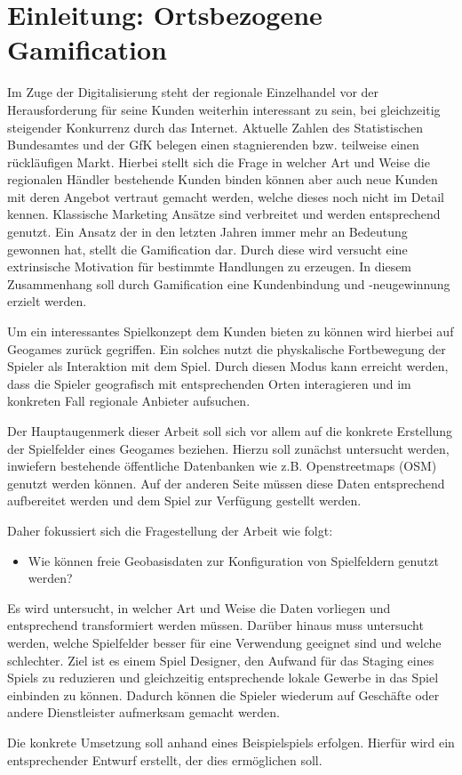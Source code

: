 \chapter{Einleitung: Ortsbezogene Gamification}
\label{ch1:Einleitung}

Im Zuge der Digitalisierung steht der regionale Einzelhandel vor der Herausforderung für seine Kunden weiterhin interessant zu sein, bei gleichzeitig steigender Konkurrenz durch das Internet. Aktuelle Zahlen des Statistischen Bundesamtes \citep{DWN.2012} und der GfK belegen einen stagnierenden bzw. teilweise einen rückläufigen Markt.
Hierbei stellt sich die Frage in welcher Art und Weise die regionalen Händler bestehende Kunden binden können aber auch neue Kunden mit deren Angebot vertraut gemacht werden, welche dieses noch nicht im Detail kennen.
Klassische Marketing Ansätze sind verbreitet und werden entsprechend genutzt.
Ein Ansatz der in den letzten Jahren immer mehr an Bedeutung gewonnen hat, stellt die Gamification dar. Durch diese wird versucht eine extrinsische Motivation für bestimmte Handlungen zu erzeugen. In diesem Zusammenhang soll durch Gamification eine Kundenbindung und -neugewinnung erzielt werden.

Um ein interessantes Spielkonzept dem Kunden bieten zu können wird hierbei auf Geogames zurück gegriffen.
Ein solches nutzt die physkalische Fortbewegung der Spieler als Interaktion mit dem Spiel.
Durch diesen Modus kann erreicht werden, dass die Spieler geografisch mit entsprechenden Orten interagieren und im konkreten Fall regionale Anbieter aufsuchen.

Der Hauptaugenmerk dieser Arbeit soll sich vor allem auf die konkrete Erstellung der Spielfelder eines Geogames beziehen. Hierzu soll zunächst untersucht werden, inwiefern bestehende öffentliche Datenbanken wie z.B. Openstreetmaps (OSM) genutzt werden können. Auf der anderen Seite müssen diese Daten entsprechend aufbereitet werden und dem Spiel zur Verfügung gestellt werden.

Daher fokussiert sich die Fragestellung der Arbeit wie folgt:
\begin{itemize}
  \item Wie können freie Geobasisdaten zur Konfiguration von Spielfeldern genutzt werden?
\end{itemize}

Es wird untersucht, in welcher Art und Weise die Daten vorliegen und entsprechend transformiert werden müssen.
Darüber hinaus muss untersucht werden, welche Spielfelder besser für eine Verwendung geeignet sind und welche schlechter.
Ziel ist es einem Spiel Designer, den Aufwand für das Staging eines Spiels zu reduzieren und gleichzeitig entsprechende lokale Gewerbe in das Spiel einbinden zu können. Dadurch können die Spieler wiederum auf Geschäfte oder andere Dienstleister aufmerksam gemacht werden.

Die konkrete Umsetzung soll anhand eines Beispielspiels erfolgen.
Hierfür wird ein entsprechender Entwurf erstellt, der dies ermöglichen soll.


